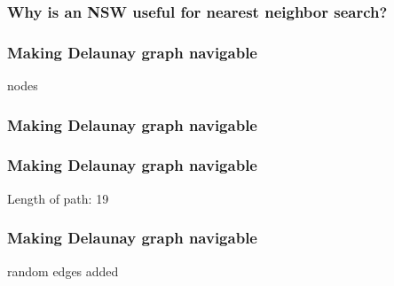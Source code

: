 \documentclass{beamer}
\begin{document}
  \begin{frame}
    \frametitle{Why is an NSW useful for nearest neighbor search?}  
    \Large
    \begin{itemize}
    \end{itemize}
  \end{frame}
  
  \begin{frame}
    \frametitle{Making Delaunay graph navigable}  
          \begin{figure}[delaunay_triangulation_256_points]
  
  \end{figure}
  \vspace{-0.5cm}
     nodes
  \end{frame}  

  \begin{frame}
    \frametitle{Making Delaunay graph navigable}  
          \begin{figure}[delaunay_triangulation_start_end_points]
  
  \end{figure}
  \end{frame}  

  \begin{frame}
    \frametitle{Making Delaunay graph navigable}  
          \begin{figure}[delaunay_triangulation_longest_path]
  
  \end{figure}
  \vspace{-0.5cm}
    \centering Length of path: 19
  \end{frame}  

  \begin{frame}
    \frametitle{Making Delaunay graph navigable}  
          \begin{figure}[delaunay_triangulation_random_edges]
  
  \end{figure}
  \vspace{-0.5cm}
     random edges added
  \end{frame}  
\end{document}
